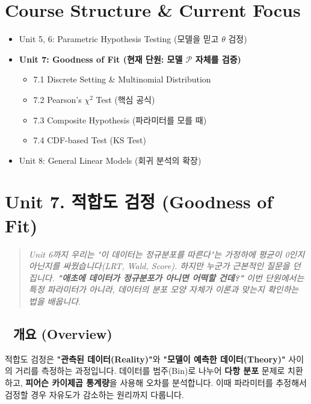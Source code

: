 \documentclass[11pt,a4paper]{book}
\theoremstyle{definition}
\begin{document}
\section*{Course Structure \& Current Focus}
\begin{itemize}
    \item Unit 5, 6: Parametric Hypothesis Testing (모델을 믿고 $\theta$ 검정)
    \item \textbf{\textcolor{mainblue}{Unit 7: Goodness of Fit (현재 단원: 모델 $\mathcal{P}$ 자체를 검증)}}
    \begin{itemize}
        \item 7.1 Discrete Setting \& Multinomial Distribution
        \item 7.2 Pearson's $\chi^2$ Test (핵심 공식)
        \item 7.3 Composite Hypothesis (파라미터를 모를 때)
        \item 7.4 CDF-based Test (KS Test)
    \end{itemize}
    \item Unit 8: General Linear Models (회귀 분석의 확장)
\end{itemize}


\section{Unit 7. 적합도 검정 (Goodness of Fit)}

\begin{quote}
\textit{Unit 6까지 우리는 "이 데이터는 정규분포를 따른다"는 가정하에 평균이 0인지 아닌지를 싸웠습니다(LRT, Wald, Score). 하지만 누군가 근본적인 질문을 던집니다. \textbf{"애초에 데이터가 정규분포가 아니면 어떡할 건데?"} 이번 단원에서는 특정 파라미터가 아니라, 데이터의 분포 모양 자체가 이론과 맞는지 확인하는 법을 배웁니다.}
\end{quote}

\subsection*{📌 개요 (Overview)}
적합도 검정은 \textbf{"관측된 데이터(Reality)"}와 \textbf{"모델이 예측한 데이터(Theory)"} 사이의 거리를 측정하는 과정입니다. 데이터를 범주(Bin)로 나누어 \textbf{다항 분포} 문제로 치환하고, \textbf{피어슨 카이제곱 통계량}을 사용해 오차를 분석합니다. 이때 파라미터를 추정해서 검정할 경우 자유도가 감소하는 원리까지 다룹니다.

\end{document}
